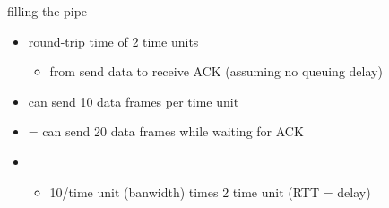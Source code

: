 \begin{frame}{filling the pipe}
    \begin{itemize}
    \item round-trip time of 2 time units
        \begin{itemize}
        \item from send data to receive ACK (assuming no queuing delay)
        \end{itemize}
    \item can send 10 data frames per time unit
    \item = can send 20 data frames while waiting for ACK
    \vspace{.5cm}
    \item<2> 
        \begin{itemize}
        \item 10/time unit (banwidth) times 2 time unit (RTT = delay)
        \end{itemize}
    \end{itemize}
\end{frame}
